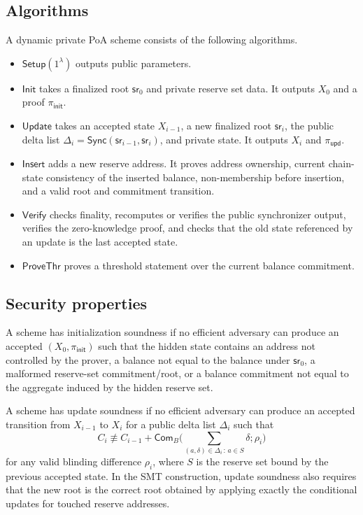\documentclass[runningheads]{llncs}
\newcommand{\Com}{\mathsf{Com}}
\newcommand{\sr}{\mathsf{sr}}
\newcommand{\Setup}{\mathsf{Setup}}
\newcommand{\Verify}{\mathsf{Verify}}
\newcommand{\Init}{\mathsf{Init}}
\newcommand{\Upd}{\mathsf{Update}}
\newcommand{\Insert}{\mathsf{Insert}}
\newcommand{\Sync}{\mathsf{Sync}}
\newcommand{\dlist}{\Delta}
\begin{document}
\subsection{Algorithms}

A dynamic private PoA scheme consists of the following algorithms.

\begin{itemize}[leftmargin=1.5em]
    \item \(\Setup(1^\lambda)\) outputs public parameters.
    \item \(\Init\) takes a finalized root \(\sr_0\) and private reserve set data.  It outputs \(X_0\) and a proof \(\pi_{\mathsf{init}}\).
    \item \(\Upd\) takes an accepted state \(X_{i-1}\), a new finalized root \(\sr_i\), the public delta list \(\dlist_i=\Sync(\sr_{i-1},\sr_i)\), and private state.  It outputs \(X_i\) and \(\pi_{\mathsf{upd}}\).
    \item \(\Insert\) adds a new reserve address.  It proves address ownership, current chain-state consistency of the inserted balance, non-membership before insertion, and a valid root and commitment transition.
    \item \(\Verify\) checks finality, recomputes or verifies the public synchronizer output, verifies the zero-knowledge proof, and checks that the old state referenced by an update is the last accepted state.
    \item \(\mathsf{ProveThr}\) proves a threshold statement over the current balance commitment.
\end{itemize}

\subsection{Security properties}

\begin{definitionx}
A scheme has initialization soundness if no efficient adversary can produce an accepted \((X_0,\pi_{\mathsf{init}})\) such that the hidden state contains an address not controlled by the prover, a balance not equal to the balance under \(\sr_0\), a malformed reserve-set commitment/root, or a balance commitment not equal to the aggregate induced by the hidden reserve set.
\end{definitionx}

\begin{definitionx}
A scheme has update soundness if no efficient adversary can produce an accepted transition from \(X_{i-1}\) to \(X_i\) for a public delta list \(\dlist_i\) such that
\[
        C_i \not\equiv C_{i-1}+\Com_B\Big(\sum_{(a,\delta)\in\dlist_i\,:\,a\in S}\delta;\rho_i\Big)
\]
for any valid blinding difference \(\rho_i\), where \(S\) is the reserve set bound by the previous accepted state.  In the SMT construction, update soundness also requires that the new root is the correct root obtained by applying exactly the conditional updates for touched reserve addresses.
\end{definitionx}
\end{document}
